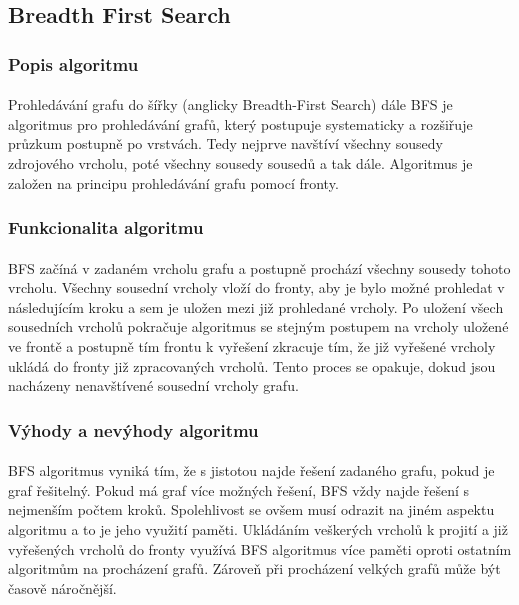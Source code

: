 \documentclass[12pt, titlepage, a4paper]{article}
\begin{document}
\subsection{Breadth First Search}
\subsubsection{Popis algoritmu}
\paragraph{}
Prohledávání grafu do šířky (anglicky Breadth-First Search) dále BFS je algoritmus
pro prohledávání grafů, který postupuje systematicky a rozšiřuje průzkum postupně po
vrstvách. Tedy nejprve navštíví všechny sousedy zdrojového vrcholu, poté všechny sousedy
sousedů a tak dále. Algoritmus je založen na principu prohledávání grafu pomocí fronty.

\subsubsection{Funkcionalita algoritmu}
\paragraph{}
BFS začíná v zadaném vrcholu grafu a postupně prochází všechny sousedy tohoto vrcholu.
Všechny sousední vrcholy vloží do fronty, aby je bylo možné prohledat v následujícím kroku
a sem je uložen mezi již prohledané vrcholy. Po uložení všech sousedních vrcholů pokračuje
algoritmus se stejným postupem na vrcholy uložené ve frontě a postupně tím frontu k vyřešení
zkracuje tím, že již vyřešené vrcholy ukládá do fronty již zpracovaných vrcholů. Tento proces
se opakuje, dokud jsou nacházeny nenavštívené sousední vrcholy grafu.

\subsubsection{Výhody a nevýhody algoritmu}
\paragraph{}
BFS algoritmus vyniká tím, že s jistotou najde řešení zadaného grafu, pokud je graf řešitelný.
Pokud má graf více možných řešení, BFS vždy najde řešení s nejmenším počtem kroků. Spolehlivost
se ovšem musí odrazit na jiném aspektu algoritmu a to je jeho využití paměti. Ukládáním veškerých
vrcholů k projití a již vyřešených vrcholů do fronty využívá BFS algoritmus více paměti oproti ostatním algoritmům
na procházení grafů. Zároveň při procházení velkých grafů může být časově náročnější.
\end{document}
